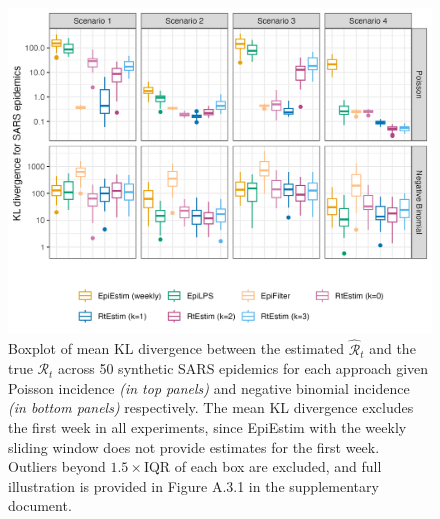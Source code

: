 \documentclass[10pt,letterpaper]{article}
\def\calR{\mathcal{R}}
\renewcommand{\hat}{\widehat}
\begin{document}
\begin{figure}[!ht]
  \centering
  \includegraphics[width=.99\textwidth]{fig/fig_kl_week_sars.png}
  \caption{Boxplot of mean KL divergence between the estimated 
  $\hat{\calR}_t$ and the true $\calR_t$ across 50 synthetic SARS epidemics for 
  each approach given Poisson incidence \textit{(in top panels)} and negative 
  binomial incidence \textit{(in bottom panels)} respectively. 
  The mean KL divergence excludes the first week in all experiments, 
  since EpiEstim with the weekly sliding window does not provide estimates 
  for the first week. Outliers beyond $1.5\times$IQR of each box are excluded, 
  and full illustration is provided in Figure A.3.1 in the supplementary document.} 
  \label{fig:kl-res-sars}
\end{figure}
\end{document}
